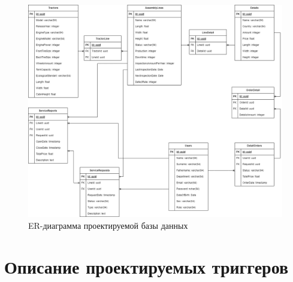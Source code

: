 \begin{figure}[H]
    \centering
    \includegraphics[width=1\textwidth]{templates/coursework/inc/img/er.png}
    \caption{ER-диаграмма проектируемой базы данных}
    \label{img:erdb}
\end{figure}

\section{Описание проектируемых триггеров}

